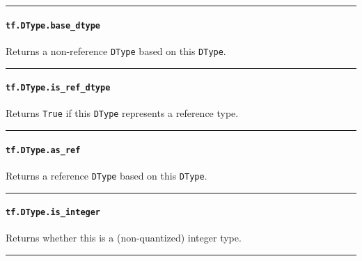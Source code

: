 \begin{center}\rule{0.5\linewidth}{\linethickness}\end{center}

\paragraph{\texorpdfstring{\lstinline{tf.DType.base_dtype}
}{tf.DType.base_dtype }}\label{tf.dtype.baseux5fdtype}

Returns a non-reference \lstinline{DType} based on this \lstinline{DType}.

\begin{center}\rule{0.5\linewidth}{\linethickness}\end{center}

\paragraph{\texorpdfstring{\lstinline{tf.DType.is_ref_dtype}
}{tf.DType.is_ref_dtype }}\label{tf.dtype.isux5frefux5fdtype}

Returns \lstinline{True} if this \lstinline{DType} represents a reference
type.

\begin{center}\rule{0.5\linewidth}{\linethickness}\end{center}

\paragraph{\texorpdfstring{\lstinline{tf.DType.as_ref}
}{tf.DType.as_ref }}\label{tf.dtype.asux5fref}

Returns a reference \lstinline{DType} based on this \lstinline{DType}.

\begin{center}\rule{0.5\linewidth}{\linethickness}\end{center}

\paragraph{\texorpdfstring{\lstinline{tf.DType.is_integer}
}{tf.DType.is_integer }}\label{tf.dtype.isux5finteger}

Returns whether this is a (non-quantized) integer type.

\begin{center}\rule{0.5\linewidth}{\linethickness}\end{center}

